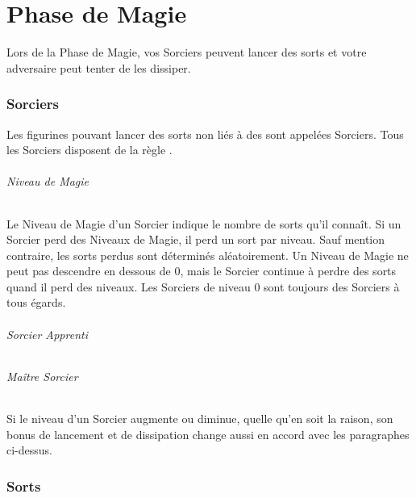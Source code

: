 
\hypertarget{magicphase}{\part{Phase de Magie}}

Lors de la Phase de Magie, vos Sorciers peuvent lancer des sorts et votre adversaire peut tenter de les dissiper.

\section{Sorciers}

Les figurines pouvant lancer des sorts non liés à des \boundspells{} sont appelées Sorciers. Tous les Sorciers disposent de la règle \channel{}.

\paragraph{Niveau de Magie} 

Le Niveau de Magie d'un Sorcier indique le nombre de sorts qu'il connaît. Si un Sorcier perd des Niveaux de Magie, il perd un sort par niveau. Sauf mention contraire, les sorts perdus sont déterminés aléatoirement. Un Niveau de Magie ne peut pas descendre en dessous de 0, mais le Sorcier continue à perdre des sorts quand il perd des niveaux. Les Sorciers de niveau 0 sont toujours des Sorciers à tous égards.

\paragraph{Sorcier Apprenti} 


\paragraph{Maître Sorcier} 


Si le niveau d'un Sorcier augmente ou diminue, quelle qu'en soit la raison, son bonus de lancement et de dissipation change aussi en accord avec les paragraphes ci-dessus.

\section{Sorts}


